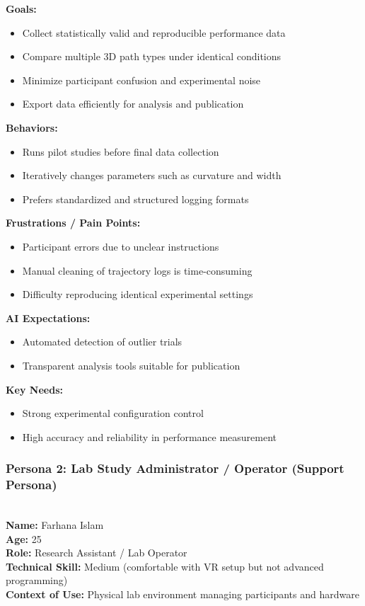 \documentclass[sigconf]{acmart}
\begin{document}
\textbf{Goals:}
\begin{itemize}
    \item Collect statistically valid and reproducible performance data
    \item Compare multiple 3D path types under identical conditions
    \item Minimize participant confusion and experimental noise
    \item Export data efficiently for analysis and publication
\end{itemize}

\textbf{Behaviors:}
\begin{itemize}
    \item Runs pilot studies before final data collection
    \item Iteratively changes parameters such as curvature and width
    \item Prefers standardized and structured logging formats
\end{itemize}

\textbf{Frustrations / Pain Points:}
\begin{itemize}
    \item Participant errors due to unclear instructions
    \item Manual cleaning of trajectory logs is time-consuming
    \item Difficulty reproducing identical experimental settings
\end{itemize}

\textbf{AI Expectations:}
\begin{itemize}
    \item Automated detection of outlier trials
    \item Transparent analysis tools suitable for publication
\end{itemize}

\textbf{Key Needs:}
\begin{itemize}
    \item Strong experimental configuration control
    \item High accuracy and reliability in performance measurement
\end{itemize}

\subsubsection{Persona 2: Lab Study Administrator / Operator (Support Persona)}
\leavevmode\\
\textbf{Name:} Farhana Islam \\
\textbf{Age:} 25 \\
\textbf{Role:} Research Assistant / Lab Operator \\
\textbf{Technical Skill:} Medium (comfortable with VR setup but not advanced programming) \\
\textbf{Context of Use:} Physical lab environment managing participants and hardware \\
\end{document}
